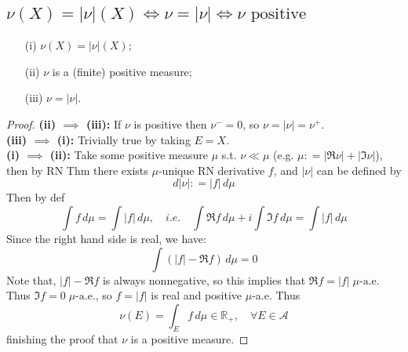 \documentclass[lang=cn,11pt]{elegantbook}
\begin{document}
\subsection{$\nu(X)=|\nu|(X) \iff \nu =|\nu| \iff \nu  \text{ positive}$}
    \begin{itemize}
    \item[(i)]$\nu(X)=|\nu|(X)$; 
    \item[(ii)]      $\nu$ is a (finite) positive measure; 
    \item[(iii)]      $\nu=|\nu|$. 
  \end{itemize}
\begin{proof}
 \textbf{(ii) $\implies$ (iii):} If $\nu$ is positive then $\nu^- = 0$, so $\nu =  |\nu| = \nu^+$.\\
\textbf{(iii) $\implies$ (i):} Trivially true by taking $E = X$.\\
\textbf{(i) $\implies$ (ii):} Take some positive measure $\mu$ s.t.  $\nu \ll \mu$ (e.g. $\mu: =  |\Re \nu | + | \Im \nu |$), then by RN Thm there exists $\mu$-unique RN derivative $f$, and $|\nu|$ can be defined by \[
d |\nu|  : =  |f | \,d \mu
\]
Then by def \[ \int f \, d\mu  = \int |f| \, d\mu,\quad i.e.\quad \int \Re f \, d\mu   + i \int \Im f \, d\mu = \int |f| \, d\mu\]
Since the right hand side is real, we have:\[ \int ( |f| - \Re f) \, d\mu  =  0
\]
Note that, $|f| - \Re f$ is always nonnegative, so this implies that $\Re f = |f|\; \mu\text{-a.e.}$ \\
Thus $\Im f = 0\; \mu\text{-a.e.}$, so $f = |f|$ is real and positive $\mu$-a.e.
Thus \[
 \nu(E)  = \int_E f \, d\mu  \in \mathbb{R}_+,\quad \forall E\in\mathcal{A}
\]
finishing the proof that $\nu$ is a positive measure.
\end{proof}
\end{document}
